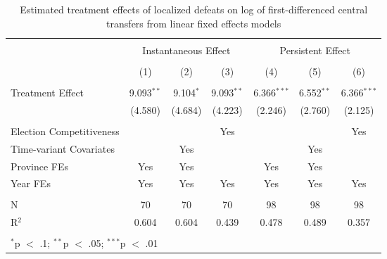 
\begin{table}[!htbp] \centering 
  \caption{Estimated treatment effects of localized defeats on log of first-differenced central transfers from linear fixed effects models} 
  \label{tab:lfe_main} 
\begin{tabular}{@{\extracolsep{5pt}}lcccccc} 
\\[-1.8ex]\hline 
\hline \\[-1.8ex] 
 & \multicolumn{3}{c}{Instantaneous Effect} & \multicolumn{3}{c}{Persistent Effect} \\ 
\\[-1.8ex] & (1) & (2) & (3) & (4) & (5) & (6)\\ 
\hline \\[-1.8ex] 
 Treatment Effect & 9.093$^{**}$ & 9.104$^{*}$ & 9.093$^{**}$ & 6.366$^{***}$ & 6.552$^{**}$ & 6.366$^{***}$ \\ 
  & (4.580) & (4.684) & (4.223) & (2.246) & (2.760) & (2.125) \\ 
 \hline \\[-1.8ex] 
Election Competitiveness &  &  & Yes &  &  & Yes \\ 
Time-variant Covariates &  & Yes &  &  & Yes &  \\ 
Province FEs & Yes & Yes &  & Yes & Yes &  \\ 
Year FEs & Yes & Yes & Yes & Yes & Yes & Yes \\ 
\hline \\[-1.8ex] 
N & 70 & 70 & 70 & 98 & 98 & 98 \\ 
R$^{2}$ & 0.604 & 0.604 & 0.439 & 0.478 & 0.489 & 0.357 \\ 
\hline 
\hline \\[-1.8ex] 
\multicolumn{7}{l}{$^{*}$p $<$ .1; $^{**}$p $<$ .05; $^{***}$p $<$ .01} \\ 
\end{tabular} 
\end{table} 
